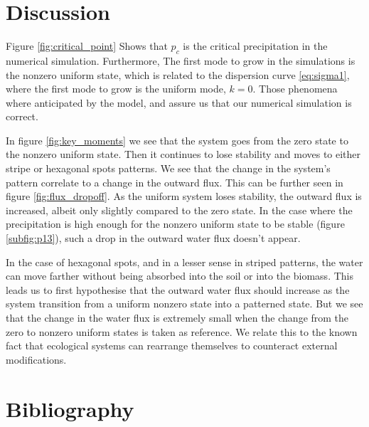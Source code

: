 \documentclass{article}
\numberwithin{equation}{section}
\begin{document}
\section{Discussion}

Figure \ref{fig:critical_point} Shows that $p_c$ is the critical precipitation in the numerical simulation. Furthermore, The first mode to grow in the simulations is the nonzero uniform state, which is related to the dispersion curve \ref{eq:sigma1}, where the first mode to grow is the uniform mode, $k=0$. Those phenomena where anticipated by the model, and assure us that our numerical simulation is correct.

In figure \ref{fig:key_moments} we see that the system goes from the zero state to the nonzero uniform state. Then it continues to lose stability and moves to either stripe or hexagonal spots patterns. We see that the change in the system's pattern correlate to a change in the outward flux. This can be further seen in figure \ref{fig:flux_dropoff}. As the uniform system loses stability, the outward flux is increased, albeit only slightly compared to the zero state. In the case where the precipitation is high enough for the nonzero uniform state to be stable (figure \ref{subfig:p13}), such a drop in the outward water flux doesn't appear.

In the case of hexagonal spots, and in a lesser sense in  striped patterns, the water can move farther without being absorbed into the soil or into the biomass. This leads us to first hypothesise that the outward water flux should increase as the system transition from a uniform nonzero state into a patterned state. But we see that the change in the water flux is extremely small when the change from the zero to nonzero uniform states is taken as reference. We relate this to the known fact that ecological systems can rearrange themselves to counteract external modifications.

\section{Bibliography}
\printbibliography
\end{document}
